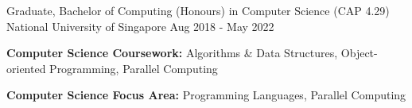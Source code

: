 

\begin{cventries}

  \cventry
    {Graduate, Bachelor of Computing (Honours) in Computer Science (CAP 4.29)} %
    {National University of Singapore} %
    {} %
    {Aug 2018 - May 2022} %
    {
      \begin{cvitems} %
        \item {\textbf{Computer Science Coursework:} Algorithms \& Data Structures, Object-oriented Programming, Parallel Computing}
        \item {\textbf{Computer Science Focus Area:} Programming Languages, Parallel Computing}
      \end{cvitems}
    }

\end{cventries}
